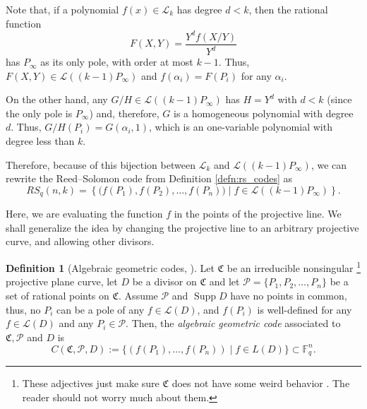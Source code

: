 \documentclass[11pt, oneside]{amsart}
\theoremstyle{definition}
\newtheorem{defn}[thm]{Definition}
\theoremstyle{remark}
\numberwithin{equation}{section}
\DeclareMathOperator{\Supp}{Supp}
\begin{document}
Note that, if a polynomial $f(x) \in \mathcal L_k$ has degree $d < k$, then the rational function \[
	F(X, Y) = \frac{Y^d f(X/Y)}{Y^d}
\]
has $P_\infty$ as its only pole, with order at most $k-1$. Thus, $F(X, Y) \in \mathcal L((k-1)P_\infty)$ and $f(\alpha_i) = F(P_i)$ for any $\alpha_i$.

On the other hand, any $G/H \in \mathcal L((k-1)P_\infty)$ has $H = Y^d$ with $d < k$ (since the only pole is $P_\infty$) and, therefore, $G$ is a homogeneous polynomial with degree $d$. Thus, $G/H(P_i) = G(\alpha_i, 1)$, which is an one-variable polynomial with degree less than $k$.

Therefore, because of this bijection between $\mathcal L_k$ and $\mathcal L((k-1)P_\infty)$, we can rewrite the Reed--Solomon code from Definition \ref{defn:rs_codes} as
\begin{equation}
	RS_q(n, k) = \left\{\big(f(P_1), f(P_2), \dots, f(P_n)\big) \mid f \in \mathcal L((k-1)P_\infty)\right\}.
\end{equation}

Here, we are evaluating the function $f$ in the points of the projective line.
We shall generalize the idea by changing the projective line to an arbitrary projective curve, and allowing other divisors.

\begin{defn}[Algebraic geometric codes, \cite{LS87, Wal00}] %
	Let $\mathfrak C$ be an irreducible nonsingular%
	\footnote{These adjectives just make sure $\mathfrak C$ does not have some weird behavior%
	. The reader should not worry much about them.}
	projective plane curve, let $D$ be a divisor on $\mathfrak C$ and let $\mathcal P = \{P_1, P_2, \dots, P_n\}$ be a set of rational points on $\mathfrak C$.
	Assume $\mathcal P$ and $\Supp D$ have no points in common, thus, no $P_i$ can be a pole of any $f \in \mathcal L(D)$, and $f(P_i)$ is well-defined for any $f \in \mathcal L(D)$ and any $P_i \in \mathcal P$.
	Then, the \emph{algebraic geometric code} associated to $\mathfrak C, \mathcal P$ and $D$ is
	\begin{equation}
		C(\mathfrak C, \mathcal P, D) := \{(f(P_1), \dots, f(P_n)) \mid f \in L(D)\} \subset \mathbb{F}_q^n.
	\end{equation}
\end{defn}
\end{document}
